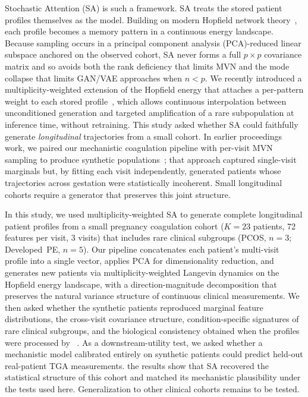 Stochastic Attention (SA) is such a framework.  SA treats the stored patient
profiles themselves as the model. Building on modern Hopfield network
theory~\citep{Ramsauer2021}, each profile becomes a memory pattern in a
continuous energy landscape. Because sampling occurs in a
principal component analysis (PCA)-reduced linear subspace anchored on the observed cohort, SA never forms a
full $p \times p$ covariance matrix and so avoids both the rank deficiency that
limits MVN and the mode collapse that limits GAN/VAE approaches when $n < p$.
We recently introduced a multiplicity-weighted extension of the Hopfield energy
that attaches a per-pattern weight to each stored profile~\citep{Varner2026Multiplicity},
which allows continuous interpolation
between unconditioned generation and targeted amplification of a rare
subpopulation at inference time, without retraining. This study asked whether SA could
faithfully generate \emph{longitudinal}
trajectories from a small cohort. In earlier proceedings work, we paired our
mechanistic coagulation pipeline with per-visit MVN sampling to produce
synthetic populations~\citep{Varner2023JuliaCon}; that approach captured
single-visit marginals but, by fitting each visit independently, generated
patients whose trajectories across gestation were statistically incoherent. Small
longitudinal cohorts require a generator that preserves this joint structure.

In this study, we used multiplicity-weighted SA to generate complete
longitudinal patient profiles from a small pregnancy coagulation cohort
($K{=}23$ patients, 72 features per visit, 3 visits) that includes rare
clinical subgroups (PCOS, $n{=}3$; Developed~PE, $n{=}5$). Our pipeline
concatenates each patient's multi-visit profile into a single vector, applies
PCA for dimensionality reduction, and generates new patients via
multiplicity-weighted Langevin dynamics on the Hopfield energy landscape, with
a direction-magnitude decomposition that preserves the natural variance
structure of continuous clinical measurements. We then asked whether the
synthetic patients reproduced marginal feature distributions, the cross-visit
covariance structure, condition-specific signatures of rare clinical
subgroups, and the biological consistency obtained when the profiles were processed by
~\citep{BrummelZiedins2012}. As a downstream-utility test, we
asked whether a mechanistic model calibrated entirely on synthetic patients
could predict held-out real-patient TGA measurements.  the
results show that SA recovered the statistical structure of this cohort and matched its
mechanistic plausibility under the tests used here. Generalization to other clinical cohorts
remains to be tested.
